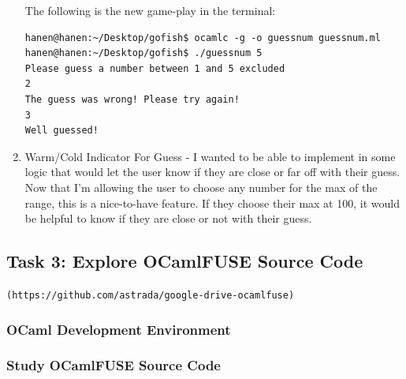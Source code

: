 \documentclass{article}
\begin{document}
\begin{enumerate}
The following is the new game-play in the terminal:
\begin{verbatim}
hanen@hanen:~/Desktop/gofish$ ocamlc -g -o guessnum guessnum.ml
hanen@hanen:~/Desktop/gofish$ ./guessnum 5
Please guess a number between 1 and 5 excluded 
2
The guess was wrong! Please try again!
3
Well guessed!
\end{verbatim}

\item Warm/Cold Indicator For Guess - I wanted to be able to implement in some logic that would let the user know if they are close or far off with their guess. Now that I'm allowing the user to choose any number for the max of the range, this is a nice-to-have feature. If they choose their max at 100, it would be helpful to know if they are close or not with their guess.
\end{enumerate}



\subsection{Task 3: Explore OCamlFUSE Source Code}

\texttt{(https://github.com/astrada/google-drive-ocamlfuse)}

\subsubsection{OCaml Development Environment}
\subsubsection{Study OCamlFUSE Source Code}
\end{document}
